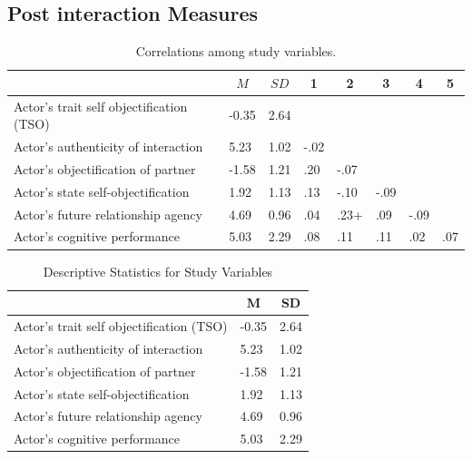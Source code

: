 \documentclass[man]{apa6}
\begin{document}
\subsection{Post interaction Measures}\label{post-interaction-measures}

\begin{table}[tbp]
\begin{center}
\begin{threeparttable}
\caption{\label{tab:corrtable}Correlations among study variables.}
\begin{tabular}{llllllll}
\toprule
 & \multicolumn{1}{c}{$M$} & \multicolumn{1}{c}{$SD$} & \multicolumn{1}{c}{1} & \multicolumn{1}{c}{2} & \multicolumn{1}{c}{3} & \multicolumn{1}{c}{4} & \multicolumn{1}{c}{5}\\
\midrule
Actor's trait self objectification (TSO) & -0.35 & 2.64 &  &  &  &  & \\
Actor's authenticity of interaction & 5.23 & 1.02 & -.02 &  &  &  & \\
Actor's objectification of partner & -1.58 & 1.21 & .20 & -.07 &  &  & \\
Actor's state self-objectification & 1.92 & 1.13 & .13 & -.10 & -.09 &  & \\
Actor's future relationship agency & 4.69 & 0.96 & .04 & .23+ & .09 & -.09 & \\
Actor's cognitive performance & 5.03 & 2.29 & .08 & .11 & .11 & .02 & .07\\
\bottomrule
\end{tabular}
\end{threeparttable}
\end{center}
\end{table}

\begin{table}[tbp]
\begin{center}
\begin{threeparttable}
\caption{\label{tab:descriptives}Descriptive Statistics for Study Variables}
\begin{tabular}{lll}
\toprule
 & \multicolumn{1}{c}{M} & \multicolumn{1}{c}{SD}\\
\midrule
Actor's trait self objectification (TSO) & -0.35 & 2.64\\
Actor's authenticity of interaction & 5.23 & 1.02\\
Actor's objectification of partner & -1.58 & 1.21\\
Actor's state self-objectification & 1.92 & 1.13\\
Actor's future relationship agency & 4.69 & 0.96\\
Actor's cognitive performance & 5.03 & 2.29\\
\bottomrule
\end{tabular}
\end{threeparttable}
\end{center}
\end{table}
\end{document}
